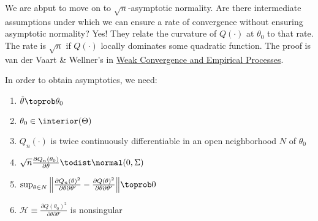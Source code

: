\documentclass[10pt]{article}
\begin{document}
\begin{remark}
	We are abput to move on to $\sqrt{n}$-asymptotic normality. Are there intermediate assumptions under which we can ensure a rate of convergence without ensuring asymptotic normality? Yes! They relate the curvature of $Q(\cdot)$ at $\theta_0$ to that rate. The rate is $\sqrt{n}$ if $Q(\cdot)$ locally dominates some quadratic function. The proof is van der Vaart \& Wellner's  in \href{https://link.springer.com/book/10.1007/978-1-4757-2545-2}{Weak Convergence and Empirical Processes}.
\end{remark}


\begin{assumption}\label{ass:asymptotics_extremum}
	In order to obtain asymptotics, we need:
	\begin{enumerate}
		\item $\hat{\theta}\toprob \theta_0$
		\item $\theta_0 \in \interior(\Theta)$
		\item $Q_n(\cdot)$ is twice continuously differentiable in an open neighborhood $N$ of $\theta_0$
		\item $\sqrt{n}\frac{\partial Q_n(\theta_0)}{\partial \theta} \todist \normal(0,\Sigma)$
		\item $\sup_{\theta\in N} \Big\|\frac{\partial Q_n(\theta)^2}{\partial \theta \partial \theta'} - \frac{\partial Q(\theta)^2}{\partial \theta \partial \theta'}\Big\| \toprob 0$
		\item $\mathcal{H} \equiv \frac{\partial Q(\theta_0)^2}{\partial \theta \partial \theta'}  $ is nonsingular
	\end{enumerate}
\end{assumption}
\end{document}
